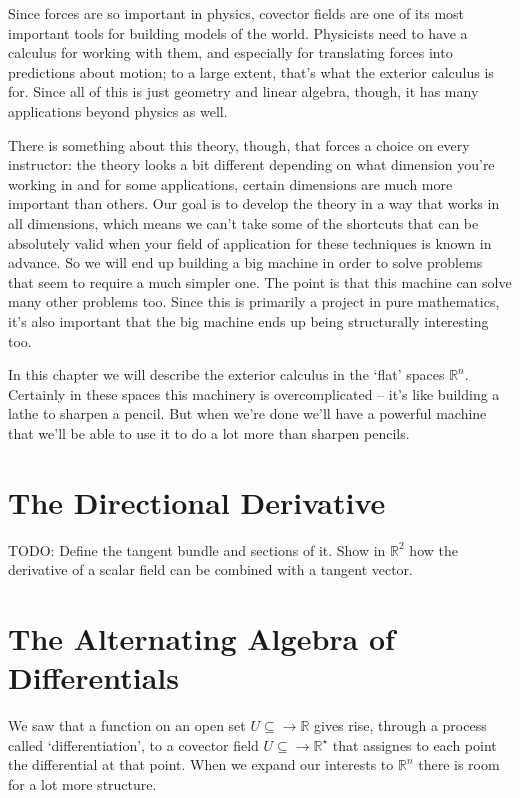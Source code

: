 \documentclass[oneside,english]{amsbook}
\numberwithin{section}{chapter}
\theoremstyle{plain}
\theoremstyle{definition}
\begin{document}
			Since forces are so important in physics, covector fields are one of its most important tools for building models of the world. Physicists need to have a calculus for working with them, and especially for translating forces into predictions about motion; to a large extent, that's what the exterior calculus is for. Since all of this is just geometry and linear algebra, though, it has many applications beyond physics as well.
			
			There is something about this theory, though, that forces a choice on every instructor: the theory looks a bit different depending on what dimension you're working in and for some applications, certain dimensions are much more important than others. Our goal is to develop the theory in a way that works in all dimensions, which means we can't take some of the shortcuts that can be absolutely valid when your field of application for these techniques is known in advance. So we will end up building a big machine in order to solve problems that seem to require a much simpler one. The point is that this machine can solve many other problems too. Since this is primarily a project in pure mathematics, it's also important that the big machine ends up being structurally interesting too.
			
			In this chapter we will describe the exterior calculus in the `flat' spaces $\mathbb{R}^n$. Certainly in these spaces this machinery is overcomplicated -- it's like building a lathe to sharpen a pencil. But when we're done we'll have a powerful machine that we'll be able to use it to do a lot more than sharpen pencils.
			
		\section{The Directional Derivative}
			
			TODO: Define the tangent bundle and sections of it. Show in $\mathbb{R}^2$ how the derivative of a scalar field can be combined with a tangent vector. 
		
		\section{The Alternating Algebra of Differentials}
		
			We saw that a function on an open set $U\subseteq \to \mathbb{R}$ gives rise, through a process called `differentiation', to a covector field $U\subseteq \to \mathbb{R}^\star$ that assignes to each point the differential at that point. When we expand our interests to $\mathbb{R}^n$ there is room for a lot more structure.
			
\end{document}
